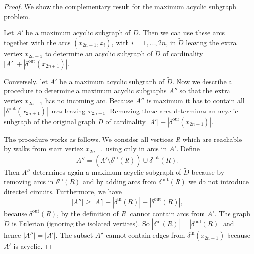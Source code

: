\documentclass{amsart}
\newcommand{\deltain}{\delta^{\mathrm{in}}}
\newcommand{\deltaout}{\delta^{\mathrm{out}}}
\begin{document}
\begin{proof}
We show the complementary result for the maximum acyclic subgraph
problem.

\smallskip

Let $A'$ be a maximum acyclic subgraph of $D$. Then we can use these
arcs together with the arcs $(x_{2n+1}, x_i)$, with
$i = 1, \ldots, 2n$, in $\tilde{D}$ leaving the extra vertex
$x_{2n+1}$ to determine an acyclic subgraph of $\tilde{D}$ of
cardinality $|A'| + |\deltaout(x_{2n+1})|$.

\smallskip

Conversely, let $A'$ be a maximum acyclic subgraph of $\tilde{D}$. Now
we describe a procedure to determine a maximum
acyclic subgraphs $A''$ so that the extra vertex $x_{2n+1}$ has no incoming
arc. Because $A''$ is maximum it has to contain all
$|\deltaout(x_{2n+1})|$ arcs leaving $x_{2n+1}$. Removing these arcs
determines an acyclic subgraph of the original graph $D$ of
cardinality $|A'| - |\deltaout(x_{2n+1})|$.

The procedure works as follows. We consider all vertices
$R$ which are reachable by walks from start
vertex $x_{2n+1}$ using only in arcs in $A'$. Define
\[
  A'' = \left(
A'
\setminus \deltain(R)
\right) \cup \deltaout(R).
\]
Then $A''$ determines again a maximum acyclic subgraph of
$\tilde{D}$ because by removing arcs in
$\deltain(R)$ and by adding arcs from
$\deltaout(R)$ we do not introduce
directed circuits. Furthermore, we have
\[
|A''| \geq  |A'| - |\deltain(R)| + |\deltaout(R)|,
\]
because $\deltaout(R)$, by the definition of
$R$, cannot contain arcs from $A'$. The
graph $\tilde{D}$ is Eulerian (ignoring the isolated vertices). So
$|\deltain(R)| = |\deltaout(R)|$ and hence $|A''| = |A'|$. The subset $A''$ cannot contain
edges from $\deltain(x_{2n+1})$ because $A'$ is acyclic.
\end{proof}
\end{document}
